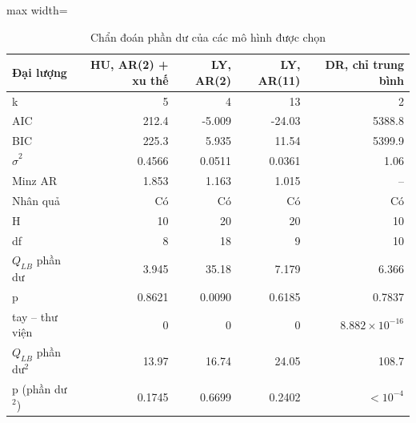 \begin{table}[H]
\centering\small
\caption{Chẩn đoán phần dư của các mô hình được chọn}\label{tab:tab_b11_14_residual_diagnostics}
\begin{adjustbox}{max width=\linewidth}
\begin{tabular}{lrrrr}
\toprule
Đại lượng & HU, AR(2) + xu thế & LY, AR(2) & LY, AR(11) & DR, chỉ trung bình \\
\midrule
k & 5 & 4 & 13 & 2 \\
AIC & 212.4 & -5.009 & -24.03 & 5388.8 \\
BIC & 225.3 & 5.935 & 11.54 & 5399.9 \\
$\hat{\sigma}^{2}$ & 0.4566 & 0.0511 & 0.0361 & 1.06 \\
Min\textbar{}z\textbar{} AR & 1.853 & 1.163 & 1.015 & – \\
Nhân quả & Có & Có & Có & Có \\
H & 10 & 20 & 20 & 10 \\
df & 8 & 18 & 9 & 10 \\
$Q_{LB}$ phần dư & 3.945 & 35.18 & 7.179 & 6.366 \\
p & 0.8621 & 0.0090 & 0.6185 & 0.7837 \\
\textbar{}tay – thư viện\textbar{} & 0 & 0 & 0 & $8.882\times10^{-16}$ \\
$Q_{LB}$ phần dư$^{2}$ & 13.97 & 16.74 & 24.05 & 108.7 \\
p (phần dư$^{2}$) & 0.1745 & 0.6699 & 0.2402 & $<10^{-4}$ \\
\bottomrule
\end{tabular}
\end{adjustbox}\par{}
\end{table}
